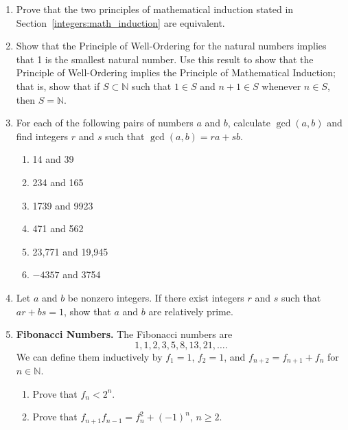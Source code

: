 {\begin{enumerate}
\item
Prove that the two principles of mathematical induction stated in Section~\ref{integers:math_induction} are equivalent. 

\item
Show that the Principle of Well-Ordering for the natural numbers implies that 1 is the smallest natural number.  Use this result to show that the Principle of Well-Ordering implies the Principle of Mathematical Induction; that is, show that if $S \subset {\mathbb N}$ such that $1 \in S$ and $n + 1 \in S$ whenever $n \in S$, then $S = {\mathbb N}$.  

\item
For each of the following pairs of numbers $a$ and $b$, calculate $\gcd(a,b)$ and find integers $r$ and $s$ such that  $\gcd(a,b) = ra + sb$. 
\begin{multicols}{2}
\begin{enumerate}

\item 
14 and 39

\item
234 and 165

\item
1739 and 9923

\item
471 and 562

\item
23,771 and 19,945

\item
$-4357$ and 3754

\end{enumerate}
\end{multicols}
 
\item 
Let $a$ and $b$ be nonzero integers. If there exist integers $r$ and $s$ such that $ar +bs =1$, show that $a$ and $b$ are relatively prime. 
 
 
\item
{\bf Fibonacci Numbers.}
The Fibonacci numbers are
\[
1, 1, 2, 3, 5, 8, 13, 21, \ldots.
\]
We can define them inductively by $f_1 = 1$, $f_2 = 1$, and $f_{n + 2} = f_{n + 1} + f_n$ for $n \in {\mathbb N}$. 
\begin{enumerate}
 
 \item
Prove that $f_n < 2^n$.
 
 \item
Prove that $f_{n + 1} f_{n - 1} = f^2_n + (-1)^n$, $n \geq 2$.
 

\end{enumerate}
\end{enumerate}}
